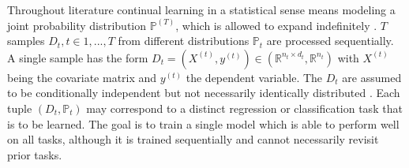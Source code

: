 Throughout literature continual learning in a statistical sense means modeling a joint probability distribution $\mathbb{P}^{(T)}$, which is allowed to expand indefinitely \cite{LW}. $T$ samples $D_t, t \in {1, ...,T}$ from different distributions $\mathbb{P}_t$ are processed sequentially. A single sample has the form $D_t = (X^{(t)},y^{(t)}) \in (\mathbb{R}^{n_t \times d_t}, \mathbb{R}^{n_t})$ with $X^{(t)}$ being the covariate matrix and $y^{(t)}$ the dependent variable. The $D_t$ are assumed to be conditionally independent but not necessarily identically distributed \cite{LW}. Each tuple $(D_t, \mathbb{P}_t)$ may correspond to a distinct regression or classification task that is to be learned. The goal is to train a single model which is able to perform well on all tasks, although it is trained sequentially and cannot necessarily revisit prior tasks. 